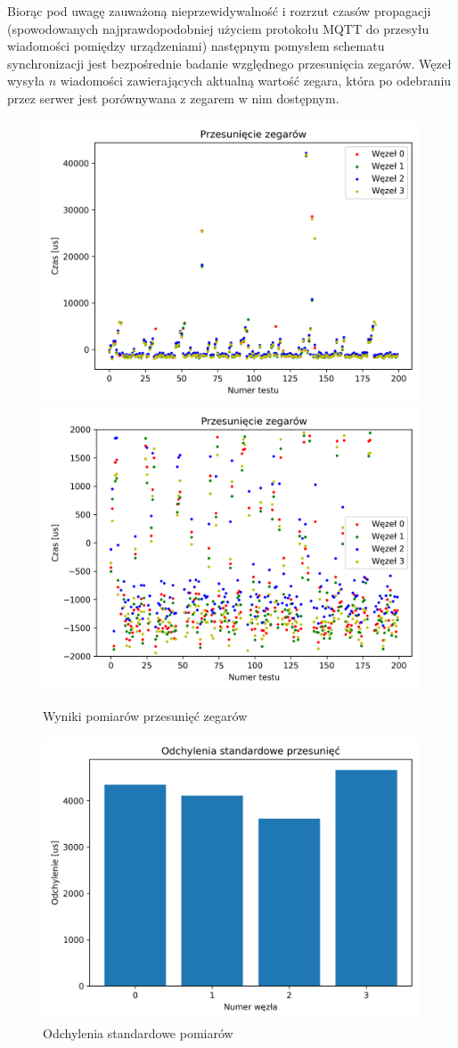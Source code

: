 Biorąc pod uwagę zauważoną nieprzewidywalność i rozrzut czasów propagacji (spowodowanych najprawdopodobniej użyciem protokołu MQTT do przesyłu wiadomości pomiędzy urządzeniami) następnym pomysłem schematu synchronizacji jest bezpośrednie badanie względnego przesunięcia zegarów. Węzeł wysyła $n$ wiadomości zawierających aktualną wartość zegara, która po odebraniu przez serwer jest porównywana z zegarem w nim dostępnym.

\begin{figure}[h]
\centering
    \includegraphics[width=.49\textwidth]{pics/time_deltas/time_deltas.png}
    \includegraphics[width=.49\textwidth]{pics/time_deltas/time_deltas_close.png}
\caption{Wyniki pomiarów przesunięć zegarów}
\label{pic:offsets_deltas}
\end{figure}

\begin{figure}[h]
\centering
    \includegraphics[width=.49\textwidth]{pics/time_deltas/stddev.png}
\caption{Odchylenia standardowe pomiarów}
\label{pic:stddev_deltas}
\end{figure}

